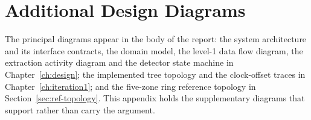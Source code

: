 \chapter{Additional Design Diagrams}
The principal diagrams appear in the body of the report: the system architecture and
its interface contracts, the domain model, the level-1 data flow diagram, the
extraction activity diagram and the detector state machine in Chapter~\ref{ch:design}; the
implemented tree topology and the clock-offset traces in Chapter~\ref{ch:iteration1}; and the
five-zone ring reference topology in Section~\ref{sec:ref-topology}. This appendix holds the
supplementary diagrams that support rather than carry the argument.

